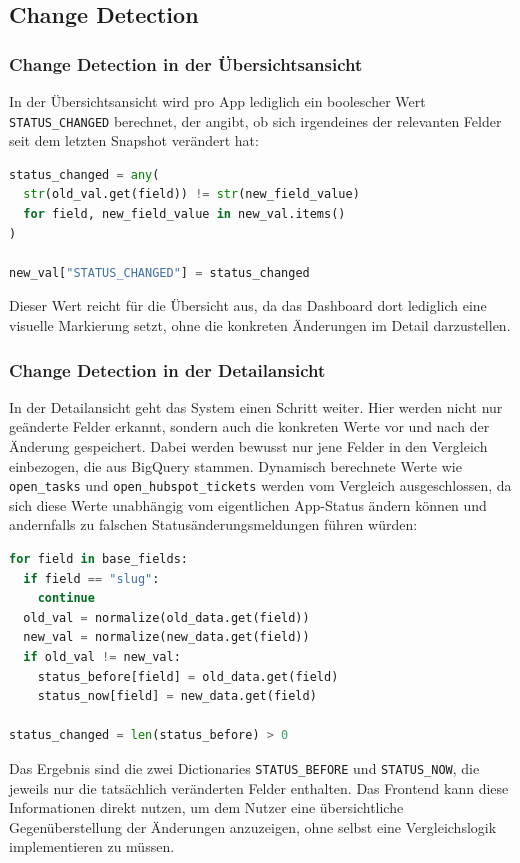 \subsection{Change Detection}

\subsubsection{Change Detection in der Übersichtsansicht}
In der Übersichtsansicht wird pro App lediglich ein boolescher Wert \texttt{STATUS\_CHANGED} berechnet, der angibt, ob sich irgendeines der relevanten Felder seit dem letzten Snapshot verändert hat:

\begin{lstlisting}[language=Python, caption={Berechnung von STATUS\_CHANGED in der Übersicht}, label={lst:status-changed-overview}]
status_changed = any(
  str(old_val.get(field)) != str(new_field_value)
  for field, new_field_value in new_val.items()
)

new_val["STATUS_CHANGED"] = status_changed
\end{lstlisting}

Dieser Wert reicht für die Übersicht aus, da das Dashboard dort lediglich eine visuelle Markierung setzt, ohne die konkreten Änderungen im Detail darzustellen.

\subsubsection{Change Detection in der Detailansicht}
In der Detailansicht geht das System einen Schritt weiter. Hier werden nicht nur geänderte Felder erkannt, sondern auch die konkreten Werte vor und nach der Änderung gespeichert. Dabei werden bewusst nur jene Felder in den Vergleich einbezogen, die aus BigQuery stammen. Dynamisch berechnete Werte wie \texttt{open\_tasks} und \texttt{open\_hubspot\_tickets} werden vom Vergleich ausgeschlossen, da sich diese Werte unabhängig vom eigentlichen App-Status ändern können und andernfalls zu falschen Statusänderungsmeldungen führen würden:

\begin{lstlisting}[language=Python, caption={Feldweiser Vergleich in der Detailansicht}, label={lst:status-changed-detail}]
for field in base_fields:
  if field == "slug":
    continue
  old_val = normalize(old_data.get(field))
  new_val = normalize(new_data.get(field))
  if old_val != new_val:
    status_before[field] = old_data.get(field)
    status_now[field] = new_data.get(field)

status_changed = len(status_before) > 0
\end{lstlisting}

Das Ergebnis sind die zwei Dictionaries \texttt{STATUS\_BEFORE} und \texttt{STATUS\_NOW}, die jeweils nur die tatsächlich veränderten Felder enthalten. Das Frontend kann diese Informationen direkt nutzen, um dem Nutzer eine übersichtliche Gegenüberstellung der Änderungen anzuzeigen, ohne selbst eine Vergleichslogik implementieren zu müssen.